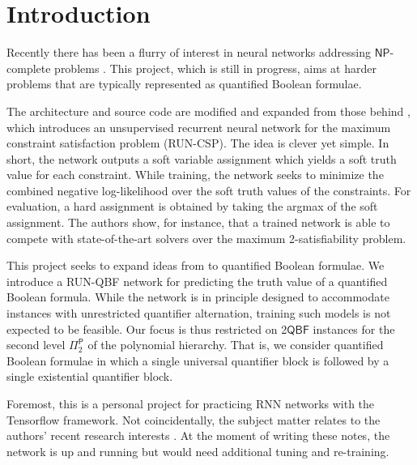 \documentclass[12pt]{article}
\newcommand*{\NP}{\mathsf{NP}}
\newcommand*{\PTIME}{\mathsf{P}}
\newcommand*{\QBF}{\mathsf{QBF}}
\newcommand*{\RUNCSP}{\textrm{RUN-CSP}\xspace}
\newcommand*{\RUNQBF}{\textrm{RUN-QBF}\xspace}
\begin{document}
\maketitle


\section{Introduction}
Recently there has been a flurry of interest in neural networks addressing $\NP$-complete problems \cite{AmizadehMW19,LemosPAL19,PratesALLV19,SelsamLBLMD19,TonshoffRWG20}. This project, which is still in progress, aims at harder problems that are typically represented as quantified Boolean formulae.

The architecture and source code are modified and expanded from those behind \cite{TonshoffRWG20}, which introduces an unsupervised recurrent neural network for the maximum constraint satisfaction problem (\RUNCSP). The idea is clever yet simple. In short, the network outputs a soft variable assignment which  yields a soft truth value for each constraint. While training, the network seeks to minimize the combined negative log-likelihood over the soft truth values of the constraints. For evaluation, a hard assignment is obtained by taking the argmax of the soft assignment. The authors show, for instance, that a trained network is able to compete with state-of-the-art solvers over the maximum 2-satisfiability problem.

This project seeks to expand ideas from \cite{TonshoffRWG20} to quantified Boolean formulae. We introduce a \RUNQBF network for predicting the truth value of a quantified Boolean formula. While the network is in principle designed to accommodate instances with unrestricted quantifier alternation, training such models is not expected to be feasible. Our focus is thus restricted on 2$\QBF$ instances for the second level $\Pi^\PTIME_2$ of the polynomial hierarchy.  That is, we consider quantified Boolean formulae in which a single universal quantifier block is followed by a single existential quantifier block. 

Foremost, this is a personal project for practicing RNN networks with the Tensorflow framework. Not coincidentally, the subject matter relates  to the authors' recent research interests \cite{HannulaKLV21}. At the moment of writing these notes, the network is up and running but would need additional tuning and re-training.
\end{document}
